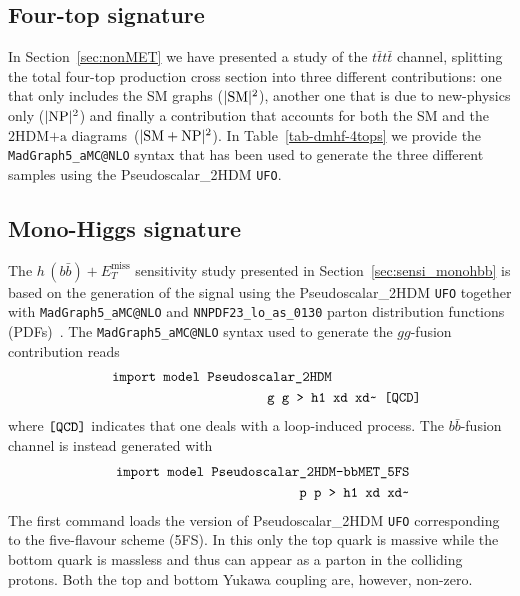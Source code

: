 \documentclass[a4paper, 11pt,notoc]{article}
\newcommand{\MET}{\ensuremath{E_T^\mathrm{miss}}\xspace}
\newcommand{\hdma}{\ensuremath{\textrm{2HDM+a}}\xspace}
\begin{document}
\subsection*{Four-top signature}

In Section~\ref{sec:nonMET} we have presented a study of the $t \bar t t \bar t$ channel, splitting the  total four-top production cross section into three different contributions: one that only includes the SM graphs ($|{\rm SM}|^2$), another one that is due to new-physics only ($|{\rm NP}|^2$) and finally a contribution that accounts for both the SM and the \hdma diagrams~($|{\rm SM} + {\rm NP}|^2$). In Table~\ref{tab-dmhf-4tops} we provide the {\tt MadGraph5\_aMC@NLO} syntax that has been used to generate the three different samples using the Pseudoscalar\_2HDM {\tt UFO}. 

\subsection*{Mono-Higgs signature}

The $h \, (b \bar b) + \MET$ sensitivity study presented in Section~\ref{sec:sensi_monohbb} is based on the generation of the signal using the Pseudoscalar\_2HDM {\tt UFO} together with {\tt MadGraph5\_aMC@NLO} and {\tt NNPDF23\_lo\_as\_0130} parton distribution functions (PDFs)~\cite{Ball:2012cx}. The {\tt MadGraph5\_aMC@NLO}  syntax used to generate the $gg$-fusion contribution reads 
\begin{eqnarray}
&& \verb| import model Pseudoscalar_2HDM | \hspace{2.25cm} \nonumber \\
&& \verb| g g > h1 xd xd~ [QCD] | \nonumber 
\end{eqnarray}
where  $\verb|[QCD]|$ indicates that one deals with a loop-induced process. The $b \bar b$-fusion channel is instead generated with 
\begin{eqnarray}
&& \verb| import model Pseudoscalar_2HDM-bbMET_5FS  | \nonumber \\
&& \verb| p p > h1 xd xd~  | \nonumber 
\end{eqnarray}
The first command loads the version of Pseudoscalar\_2HDM {\tt UFO}  corresponding to the five-flavour scheme (5FS). In this only the top quark is massive while the bottom quark is massless and thus 
can appear as a parton in the colliding protons. Both the top and bottom Yukawa coupling  are, however, non-zero.
\end{document}
